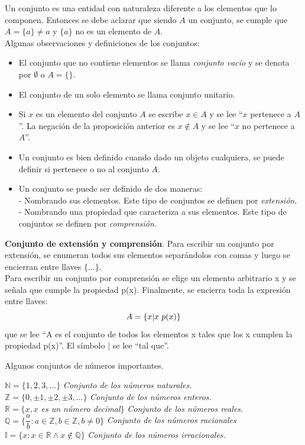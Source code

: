 Un conjunto es una entidad con naturaleza diferente a los elementos que lo componen. Entonces se debe aclarar que siendo $A$ un conjunto, se cumple que $A=\{a\}\neq a$ y $\{a\}$ no es un elemento de $A$.\\

 Algunas observaciones y definiciones de los conjuntos:
\begin{itemize}

	\item El conjunto que no contiene elementos se llama \textit{conjunto vacío} y se denota por $\emptyset$ o $A=\{\}$.
	\item El conjunto de un solo elemento se llama conjunto unitario.
	\item Si $x$ es un elemento del conjunto $A$ se escribe $x\in A$ y se lee ``$x$ pertenece a $A$''. La negación de la proposición anterior es $x\notin A$ y se lee ``$x$ no pertenece a $A$''.
	\item Un conjunto es bien definido cuando dado un objeto cualquiera, se puede definir si pertenece o no al conjunto $A$.
	\item Un conjunto se puede ser definido de dos maneras:\\
		\subitem - Nombrando sus elementos. Este tipo de conjuntos se definen por \textit{extensión}.\\
		\subitem - Nombrando una propiedad que caracteriza a sus elementos. Este tipo de conjuntos se definen por \textit{comprensión}.
\end{itemize}

\begin{mydef}
\textbf{Conjunto de extensión y comprensión}. Para escribir un conjunto por extensión, se enumeran todos sus elementos separándolos con comas y luego se encierran entre llaves $\{...\}$.\\
Para escribir un conjunto por comprensión se elige un elemento arbitrario x y se señala que cumple la propiedad p(x). Finalmente, se encierra toda la expresión entre llaves:\\
\begin{equation*}
A=\{x|x\hspace{3px}p(x)\}
\end{equation*}
que se lee ``A es el conjunto de todos los elementos x tales que los x cumplen la propiedad p(x)''. El símbolo $|$ se lee ``tal que''.
\end{mydef}

\begin{myexample}\label{ejemplosNR}
Algunos conjuntos de números importantes.
\end{myexample}
\noindent $\mathbb{N}=\{1,2,3,...\}$ \textit{Conjunto de los números naturales.}\\
$\mathbb{Z}=\{0,\pm 1,\pm 2,\pm 3,...\}$ \textit{Conjunto de los números enteros.}\\
$\mathbb{R}=\{x,x$ \textit{es un número decimal}$\}$ \textit{Conjunto de los números reales.}\\
$\mathbb{Q}=\{\dfrac{a}{b}:a\in\mathbb{Z},b\in\mathbb{Z},b\neq 0\}$ \textit{Conjunto de los números racionales}\\
$\mathbb{I}=\{x:x\in\mathbb{R}\wedge x\notin\mathbb{Q}\}$ \textit{Conjunto de los números irracionales.}

